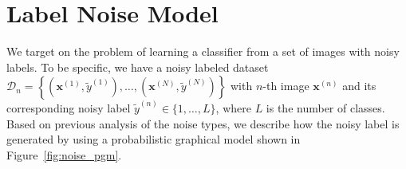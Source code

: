 \documentclass[10pt,twocolumn,letterpaper]{article}
\def\vec{\mathbf}
\begin{document}



\section{Label Noise Model} %
\label{sec:label_noise_model}
We target on the problem of learning a classifier from a set of images with noisy labels. To be specific, we have a noisy labeled dataset $\mathcal{D}_n=\left\{\left(\vec{x}^{(1)}, \tilde{y}^{(1)}\right), \dots, \left(\vec{x}^{(N)}, \tilde{y}^{(N)}\right)\right\}$ with $n$-th image $\vec{x}^{(n)}$ and its corresponding noisy label $\tilde{y}^{(n)} \in \{1,\dots,L\}$, where $L$ is the number of classes. Based on previous analysis of the noise types, we describe how the noisy label is generated by using a probabilistic graphical model shown in Figure~\ref{fig:noise_pgm}.
\end{document}
